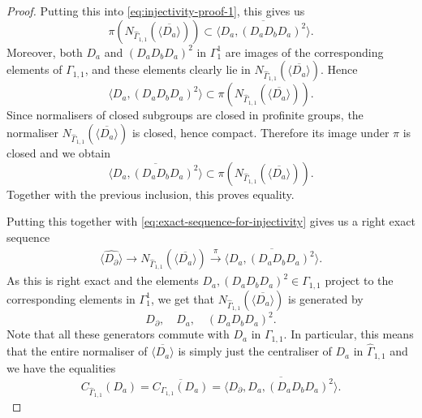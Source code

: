 \documentclass{amsart}
\theoremstyle{definition}
\numberwithin{equation}{section}
\begin{document}
\begin{proof}
    Putting this into \eqref{eq:injectivity-proof-1}, this gives us 
        \[\pi(N_{\widehat\Gamma_{1,1}}(\overline{\langle D_a\rangle}))\subset \overline{\langle D_a, (D_aD_bD_a)^2\rangle}.\]
    Moreover, both $D_a$ and $(D_aD_bD_a)^2$ in $\Gamma_1^1$ are images of the corresponding elements of $\Gamma_{1,1}$, and these elements clearly lie in
    $N_{\widehat\Gamma_{1,1}}(\overline{\langle D_a\rangle})$.
    Hence
    \[\langle D_a,(D_aD_bD_a)^2\rangle
    \subset
    \pi(N_{\widehat\Gamma_{1,1}}(\overline{\langle D_a\rangle})).\]
    Since normalisers of closed subgroups are closed in profinite groups, the normaliser
    $N_{\widehat\Gamma_{1,1}}(\overline{\langle D_a\rangle})$ is closed, hence compact. Therefore its image under $\pi$  is closed and we obtain
    \[\overline{\langle D_a,(D_aD_bD_a)^2\rangle}
    \subset
    \pi(N_{\widehat\Gamma_{1,1}}(\overline{\langle D_a\rangle})). \]
    Together with the previous inclusion, this proves equality.
    

    Putting this together with  \eqref{eq:exact-sequence-for-injectivity} gives us a right exact sequence
        \begin{align*}
            \widehat{\langle D_\partial \rangle}\to N_{\widehat\Gamma_{1,1}}(\overline{\langle D_a\rangle})\xrightarrow{\pi} \overline{\langle D_a, (D_aD_bD_a)^2\rangle}.
        \end{align*} 
    As this is right exact and the elements $D_a,(D_aD_bD_a)^2\in \Gamma_{1,1}$ project to the corresponding elements in $\Gamma_1^1$, we get that $N_{\widehat\Gamma_{1,1}}(\overline{\langle D_a\rangle})$ is generated by 
        \[D_\partial, \quad D_a, \quad (D_aD_bD_a)^2.\]
    Note that all these generators commute with $D_a$ in $\Gamma_{1,1}$. In particular, this means that the entire normaliser of $\overline{\langle D_a\rangle}$ is simply just the centraliser of $D_a$ in $\widehat{\Gamma}_{1,1}$ and we have the equalities 
        \[C_{\widehat{\Gamma}_{1,1}}(D_a)= \overline{C_{\Gamma_{1,1}}(D_a)}=\overline{\langle D_\partial, D_a, (D_aD_bD_a)^2\rangle}.\]
\end{proof}
\end{document}
